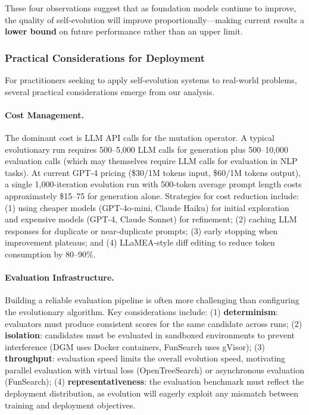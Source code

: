These four observations suggest that as foundation models continue to improve, the quality of self-evolution will improve proportionally---making current results a \textbf{lower bound} on future performance rather than an upper limit.


\subsubsection{Practical Considerations for Deployment}

For practitioners seeking to apply self-evolution systems to real-world problems, several practical considerations emerge from our analysis.

\paragraph{Cost Management.}
The dominant cost is LLM API calls for the mutation operator. A typical evolutionary run requires 500--5,000 LLM calls for generation plus 500--10,000 evaluation calls (which may themselves require LLM calls for evaluation in NLP tasks). At current GPT-4 pricing (\$30/1M tokens input, \$60/1M tokens output), a single 1,000-iteration evolution run with 500-token average prompt length costs approximately \$15--75 for generation alone. Strategies for cost reduction include: (1) using cheaper models (GPT-4o-mini, Claude Haiku) for initial exploration and expensive models (GPT-4, Claude Sonnet) for refinement; (2) caching LLM responses for duplicate or near-duplicate prompts; (3) early stopping when improvement plateaus; and (4) LLaMEA-style diff editing to reduce token consumption by 80--90\%.

\paragraph{Evaluation Infrastructure.}
Building a reliable evaluation pipeline is often more challenging than configuring the evolutionary algorithm. Key considerations include: (1) \textbf{determinism}: evaluators must produce consistent scores for the same candidate across runs; (2) \textbf{isolation}: candidates must be evaluated in sandboxed environments to prevent interference (DGM uses Docker containers, FunSearch uses gVisor); (3) \textbf{throughput}: evaluation speed limits the overall evolution speed, motivating parallel evaluation with virtual loss (OpenTreeSearch) or asynchronous evaluation (FunSearch); (4) \textbf{representativeness}: the evaluation benchmark must reflect the deployment distribution, as evolution will eagerly exploit any mismatch between training and deployment objectives.

